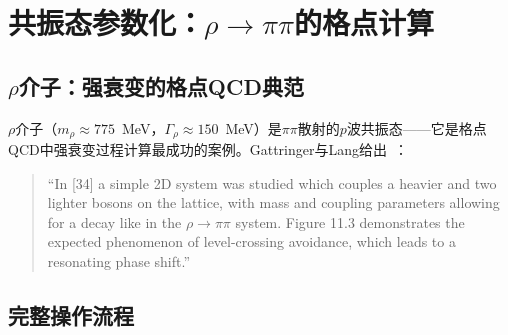 \documentclass[12pt,a4paper]{ctexart}
\theoremstyle{definition}
\begin{document}
\section{共振态参数化：$\rho\to\pi\pi$的格点计算}

\subsection{$\rho$介子：强衰变的格点QCD典范}

$\rho$介子（$m_\rho \approx 775$~MeV，$\Gamma_\rho \approx 150$~MeV）是$\pi\pi$散射的$p$波共振态——它是格点QCD中强衰变过程计算最成功的案例。Gattringer与Lang给出~\cite{GattringerLang2010}：
\begin{quote}
``In [34] a simple 2D system was studied which couples a heavier and two lighter bosons on the lattice, with mass and coupling parameters allowing for a decay like in the $\rho \to \pi\pi$ system. Figure 11.3 demonstrates the expected phenomenon of level-crossing avoidance, which leads to a resonating phase shift.''
\end{quote}

\subsection{完整操作流程}
\end{document}
